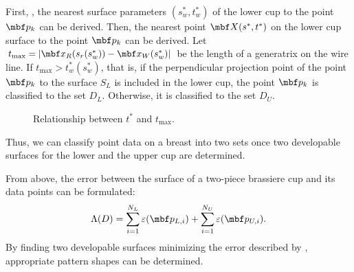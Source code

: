 \documentclass[E]{scitrans}
\begin{document}
First, , the nearest surface parameters $ (s_w^*, t_w^*) $ of the lower cup to the point $ \mbold{p}_k $ can be derived. Then, the nearest point $ \mbold{X}(s^*, t^*) $ on the lower cup surface to the point $ \mbold{p}_k $ can be derived. Let $ t_{\max}=|\mbold{x}_R (s_r (s_w^* ))-\mbold{x}_W (s_w^* )| $ be the length of a generatrix on the wire line. If $ t_{\max} > t_w^*(s_w^*) $, that is, if the perpendicular projection point of the point $ \mbold{p}_k $ to the surface $ S_L $ is included in the lower cup, the point $ \mbold{p}_k $ is classified to the set $ D_L $. Otherwise, it is classified to the set $ D_U $. 
\begin{figure}[thpb]
	\centering
	\hfil
	\caption{Relationship between $ t^*$ and $t_{\max}$.}
	\label{fig:which_in}
\end{figure}

Thus, we can classify point data on a breast into two sets once two developable surfaces for the lower and the upper cup are determined.

From above, the error between the surface of a two-piece brassiere cup and its data points can be formulated:
\begin{equation}\label{eq:Lambda_eq}
\Lambda(D) = \sum_{i=1}^{N_L} \varepsilon(\mbold{p}_{L,i}) + \sum_{i=1}^{N_U} \varepsilon(\mbold{p}_{U,i}).
\end{equation}
By finding two developable surfaces minimizing the error described by , appropriate pattern shapes can be determined.
\end{document}
